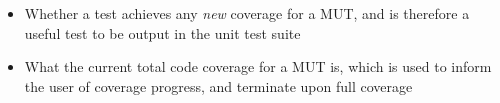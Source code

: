 \begin{itemize}
   \item Whether a test achieves any \emph{new} coverage for a MUT, and is therefore a useful test to be output in the unit test suite
   \item What the current total code coverage for a MUT is, which is used to inform the user of coverage progress, and terminate upon full coverage
\end{itemize}

